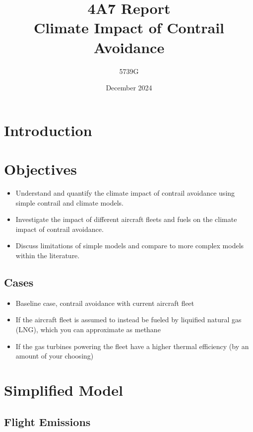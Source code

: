 \documentclass{article}
\begin{document}
\title{4A7 Report \\ Climate Impact of Contrail Avoidance}
\author{5739G}
\date{December 2024}
\maketitle

\section{Introduction}

\section{Objectives}

\begin{itemize}
    \item Understand and quantify the climate impact of contrail avoidance using simple contrail and climate models.
    \item Investigate the impact of different aircraft fleets and fuels on the climate impact of contrail avoidance.
    \item Discuss limitations of simple models and compare to more complex models within the literature.
\end{itemize}

\subsection{Cases}

\begin{itemize}
    \item Baseline case, contrail avoidance with current aircraft fleet
    \item If the aircraft fleet is assumed to instead be fueled by liquified natural gas (LNG), which you can approximate as methane
    \item If the gas turbines powering the fleet have a higher thermal efficiency (by an amount of your choosing) 
\end{itemize}

\section{Simplified Model}

\subsection{Flight Emissions}
\end{document}
